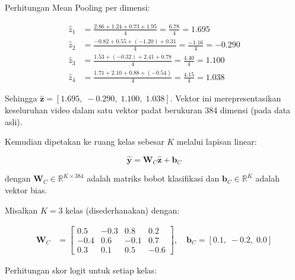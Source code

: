 \noindent Perhitungan Mean Pooling per dimensi:
 
\vspace{0.5cm}
\begin{align*}
  \hat{z}_1
  &= \frac{2.86 + 1.24 + 0.73 + 1.95}{4}
   = \frac{6.78}{4}
   = \mathbf{1.695} \\[4pt]
  \hat{z}_2
  &= \frac{-0.82 + 0.55 + (-1.20) + 0.31}{4}
   = \frac{-1.16}{4}
   = \mathbf{-0.290} \\[4pt]
  \hat{z}_3
  &= \frac{1.53 + (-0.32) + 2.41 + 0.78}{4}
   = \frac{4.40}{4}
   = \mathbf{1.100} \\[4pt]
  \hat{z}_4
  &= \frac{1.71 + 2.10 + 0.88 + (-0.54)}{4}
   = \frac{4.15}{4}
   = \mathbf{1.038}
\end{align*}
\vspace{0.5cm}
 
\noindent
Sehingga $\hat{\mathbf{z}} = [1.695,\; -0.290,\; 1.100,\; 1.038]$.
Vektor ini merepresentasikan keseluruhan video dalam satu vektor padat
berukuran 384 dimensi (pada data asli).
 
Kemudian dipetakan ke ruang kelas sebesar $K$ melalui lapisan linear:

\begin{equation}
  \hat{\mathbf{y}} = \mathbf{W}_C\hat{\mathbf{z}} + \mathbf{b}_C
\end{equation}
\vspace{0.5cm}

\noindent
dengan $\mathbf{W}_C\in\mathbb{R}^{K\times 384}$ adalah matriks bobot klasifikasi
dan $\mathbf{b}_C\in\mathbb{R}^{K}$ adalah vektor bias.
\vspace{0.5cm}
 
\noindent
Misalkan $K=3$ kelas (disederhanakan) dengan:
 
\vspace{0.5cm}
\begin{align*}
  \mathbf{W}_C
  &= \begin{bmatrix}
       0.5 & -0.3 & 0.8 & 0.2 \\
       -0.4 & 0.6 & -0.1 & 0.7 \\
       0.3 & 0.1 & 0.5 & -0.6
     \end{bmatrix},
  \quad
  \mathbf{b}_C = [0.1,\; -0.2,\; 0.0]
\end{align*}
\vspace{0.5cm}
 
\noindent Perhitungan skor logit untuk setiap kelas:
 
